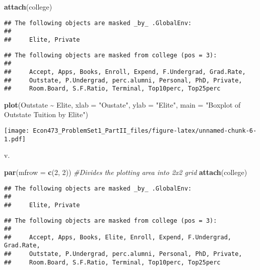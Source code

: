 \documentclass[
]{article}
\newenvironment{Shaded}{\begin{snugshade}}{\end{snugshade}}
\newcommand{\AttributeTok}[1]{\textcolor[rgb]{0.13,0.29,0.53}{#1}}
\newcommand{\CommentTok}[1]{\textcolor[rgb]{0.56,0.35,0.01}{\textit{#1}}}
\newcommand{\DecValTok}[1]{\textcolor[rgb]{0.00,0.00,0.81}{#1}}
\newcommand{\FunctionTok}[1]{\textcolor[rgb]{0.13,0.29,0.53}{\textbf{#1}}}
\newcommand{\NormalTok}[1]{#1}
\newcommand{\SpecialCharTok}[1]{\textcolor[rgb]{0.81,0.36,0.00}{\textbf{#1}}}
\newcommand{\StringTok}[1]{\textcolor[rgb]{0.31,0.60,0.02}{#1}}
\begin{document}
\begin{Shaded}
\begin{Highlighting}[]
\FunctionTok{attach}\NormalTok{(college)}
\end{Highlighting}
\end{Shaded}

\begin{verbatim}
## The following objects are masked _by_ .GlobalEnv:
## 
##     Elite, Private
\end{verbatim}

\begin{verbatim}
## The following objects are masked from college (pos = 3):
## 
##     Accept, Apps, Books, Enroll, Expend, F.Undergrad, Grad.Rate,
##     Outstate, P.Undergrad, perc.alumni, Personal, PhD, Private,
##     Room.Board, S.F.Ratio, Terminal, Top10perc, Top25perc
\end{verbatim}

\begin{Shaded}
\begin{Highlighting}[]
\FunctionTok{plot}\NormalTok{(Outstate }\SpecialCharTok{\textasciitilde{}}\NormalTok{ Elite,}
     \AttributeTok{xlab =} \StringTok{"Oustate"}\NormalTok{,}
     \AttributeTok{ylab =} \StringTok{"Elite"}\NormalTok{,}
     \AttributeTok{main =} \StringTok{"Boxplot of Outstate Tuition by Elite"}\NormalTok{)}
\end{Highlighting}
\end{Shaded}

\texttt{[image: Econ473\_ProblemSet1\_PartII\_files/figure-latex/unnamed-chunk-6-1.pdf]}

v.

\begin{Shaded}
\begin{Highlighting}[]
\FunctionTok{par}\NormalTok{(}\AttributeTok{mfrow =} \FunctionTok{c}\NormalTok{(}\DecValTok{2}\NormalTok{, }\DecValTok{2}\NormalTok{)) }\CommentTok{\#Divides the plotting area into 2x2 grid}
\FunctionTok{attach}\NormalTok{(college)}
\end{Highlighting}
\end{Shaded}

\begin{verbatim}
## The following objects are masked _by_ .GlobalEnv:
## 
##     Elite, Private
\end{verbatim}

\begin{verbatim}
## The following objects are masked from college (pos = 3):
## 
##     Accept, Apps, Books, Elite, Enroll, Expend, F.Undergrad, Grad.Rate,
##     Outstate, P.Undergrad, perc.alumni, Personal, PhD, Private,
##     Room.Board, S.F.Ratio, Terminal, Top10perc, Top25perc
\end{verbatim}
\end{document}
